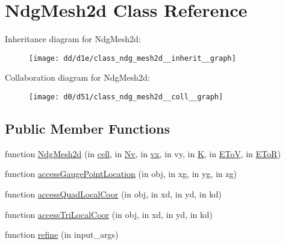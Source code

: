 \hypertarget{class_ndg_mesh2d}{}\section{Ndg\+Mesh2d Class Reference}
\label{class_ndg_mesh2d}


Inheritance diagram for Ndg\+Mesh2d\+:
\nopagebreak
\begin{figure}[H]
\begin{center}
\leavevmode
\texttt{[image: dd/d1e/class\_ndg\_mesh2d\_\_inherit\_\_graph]}
\end{center}
\end{figure}


Collaboration diagram for Ndg\+Mesh2d\+:
\nopagebreak
\begin{figure}[H]
\begin{center}
\leavevmode
\texttt{[image: d0/d51/class\_ndg\_mesh2d\_\_coll\_\_graph]}
\end{center}
\end{figure}
\subsection*{Public Member Functions}
\begin{DoxyCompactItemize}
\item 
function \hyperlink{class_ndg_mesh2d_a32859ff1a6c18eaebf90615e81ded188}{Ndg\+Mesh2d} (in \hyperlink{class_ndg_mesh_a6f128cd638adcec9a184937ad483232a}{cell}, in \hyperlink{class_ndg_mesh_a1d100eb162c56c890e007b8d2ff267a3}{Nv}, in \hyperlink{class_ndg_mesh_a2b7b3abe64802afdb217cce9a2cb3f04}{vx}, in vy, in \hyperlink{class_ndg_mesh_a81fc6a6affd3609e69eb1b8fc72b7f2f}{K}, in \hyperlink{class_ndg_mesh_a3ab88286c8e628f39ad7654d8e43fd96}{E\+ToV}, in \hyperlink{class_ndg_mesh_a58a82bb05a658319454739725b098e2a}{E\+ToR})
\item 
function \hyperlink{class_ndg_mesh2d_a98874b740e8402a14cf1aec7cf242f98}{access\+Gauge\+Point\+Location} (in obj, in xg, in yg, in zg)
\item 
function \hyperlink{class_ndg_mesh2d_ad8053d6bc3b8731fc8a991771089a2ad}{access\+Quad\+Local\+Coor} (in obj, in xd, in yd, in kd)
\item 
function \hyperlink{class_ndg_mesh2d_aefa60678f8dd4953037b5f603ef1dca3}{access\+Tri\+Local\+Coor} (in obj, in xd, in yd, in kd)
\item 
function \hyperlink{class_ndg_mesh2d_a700b8daf4a622a56ec32bb647b9dcde0}{refine} (in input\+\_\+args)
\end{DoxyCompactItemize}
